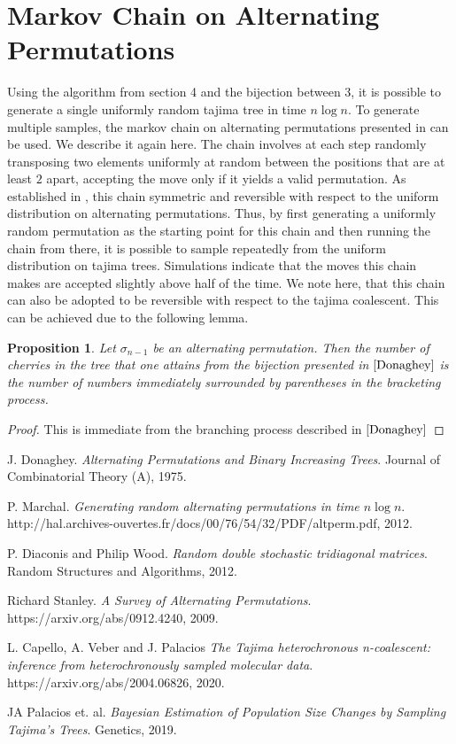 \documentclass[11pt]{article}
\newtheorem{proposition}[definition]{Proposition}
\begin{document}
\section{Markov Chain on Alternating Permutations}
Using the algorithm from section 4 and the bijection between 3, it is possible to generate a single uniformly random tajima tree in time $n\log n$. To generate multiple samples, the markov chain on alternating permutations presented in \cite{Diaconis} can be used. We describe it again here. The chain involves at each step randomly transposing two elements uniformly at random between the positions that are at least $2$ apart, accepting the move only if it yields a valid permutation. As established in \cite{Diaconis}, this chain symmetric and reversible with respect to the uniform distribution on alternating permutations. Thus, by first generating a uniformly random permutation as the starting point for this chain and then running the chain from there, it is possible to sample repeatedly from the uniform distribution on tajima trees. Simulations indicate that the moves this chain makes are accepted slightly above half of the time. We note here, that this chain can also be adopted to be reversible with respect to the tajima coalescent. This can be achieved due to the following lemma.
\begin{proposition}
Let $\sigma_{n - 1}$ be an alternating permutation. Then the number of cherries in the tree that one attains from the bijection presented in $\cite{Donaghey}$ is the number of numbers immediately surrounded by parentheses in the bracketing process. 
\end{proposition}
\begin{proof}
This is immediate from the branching process described in $\cite{Donaghey}$
\end{proof}

\begin{thebibliography}{9}

J. Donaghey. 
\textit{Alternating Permutations and Binary Increasing Trees}. Journal of Combinatorial Theory (A), 1975.

P. Marchal. 
\textit{Generating random alternating permutations in time $n\log n$}. 
http://hal.archives-ouvertes.fr/docs/00/76/54/32/PDF/altperm.pdf, 2012.

P. Diaconis and Philip Wood. 
\textit{Random double stochastic tridiagonal matrices}. 
Random Structures and Algorithms, 2012.

Richard Stanley.
\textit{A Survey of Alternating Permutations}. 
https://arxiv.org/abs/0912.4240, 2009. 

L. Capello, A. Veber and J. Palacios
\textit{The Tajima heterochronous n-coalescent: inference
from heterochronously sampled molecular data}. 
https://arxiv.org/abs/2004.06826, 2020.

JA Palacios et. al.
\textit{Bayesian Estimation of Population Size Changes by
Sampling Tajima’s Trees}. 
Genetics, 2019. 

\end{thebibliography}
\end{document}
